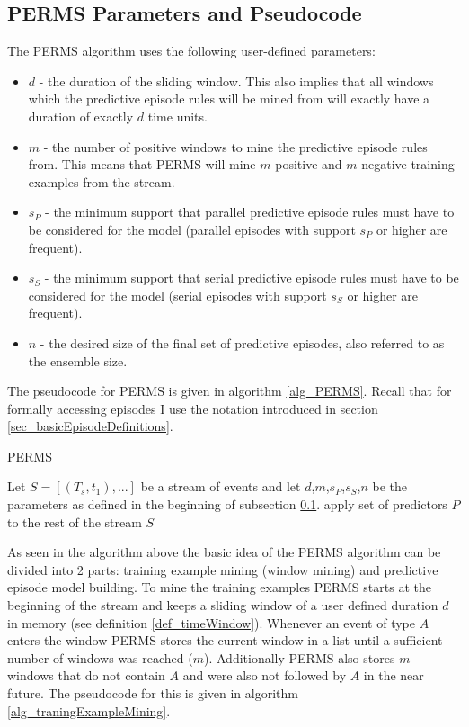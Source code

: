 \subsection{PERMS Parameters and Pseudocode}
\label{subsec_perms}

The PERMS algorithm uses the following user-defined parameters:

\begin{itemize}
	\item \textbf{$d$} - the duration of the sliding window. This also implies that all windows which the predictive episode rules will be mined from will exactly have a duration of exactly $d$ time units.
	\item \textbf{$m$} - the number of positive windows to mine the predictive episode rules from. This means that PERMS will mine $m$ positive and $m$ negative training examples from the stream.
	\item \textbf{$s_P$} - the minimum support that parallel predictive episode rules must have to be considered for the model (parallel episodes with support $s_P$ or higher are frequent).
	\item \textbf{$s_S$} - the minimum support that serial predictive episode rules must have to be considered for the model (serial episodes with support $s_S$ or higher are frequent).
	\item \textbf{$n$} - the desired size of the final set of predictive episodes, also referred to as the ensemble size.
\end{itemize}

The pseudocode for PERMS is given in algorithm \ref{alg_PERMS}. Recall that for formally accessing episodes I use the notation introduced in section \ref{sec_basicEpisodeDefinitions}.

\begin{algorithm}[H]
  \caption{PERMS
    \label{alg_PERMS}}
  \begin{algorithmic}[1]
    \Statex
    \Require Let $S=[(T_s,t_1),...]$ be a stream of events and let $d$,$m$,$s_P$,$s_S$,$n$ be the parameters as defined in the beginning of subsection \ref{subsec_perms}.
      \State apply set of predictors $P$ to the rest of the stream $S$
    \EndFunction
  \end{algorithmic}
\end{algorithm}

As seen in the algorithm above the basic idea of the PERMS algorithm can be divided into 2 parts: training example mining (window mining) and predictive episode model building. To mine the training examples PERMS starts at the beginning of the stream and keeps a sliding window of a user defined duration $d$ in memory (see definition \ref{def_timeWindow}). Whenever an event of type $A$ enters the window PERMS stores the current window in a list until a sufficient number of windows was reached ($m$). Additionally PERMS also stores $m$ windows that do not contain $A$ and were also not followed by $A$ in the near future. The pseudocode for this is given in algorithm \ref{alg_traningExampleMining}.

